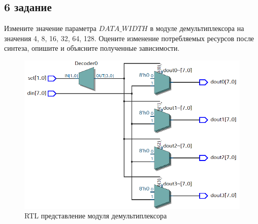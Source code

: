 \documentclass[a4paper,14pt]{article}
\begin{document}
\subsection{6 задание}

Измените значение параметра $DATA\_WIDTH$ в модуле демультиплексора на значения 4, 8, 16, 32, 64, 128. Оцените изменение потребляемых ресурсов после синтеза, опишите и объясните полученные зависимости.


\begin{figure}[H]
	\centering
	\includegraphics[width=0.6\linewidth]{img/z6_sh}
	\caption{RTL представление модуля демультиплексора}
	\label{fig:z6_sh}
\end{figure}
\end{document}
